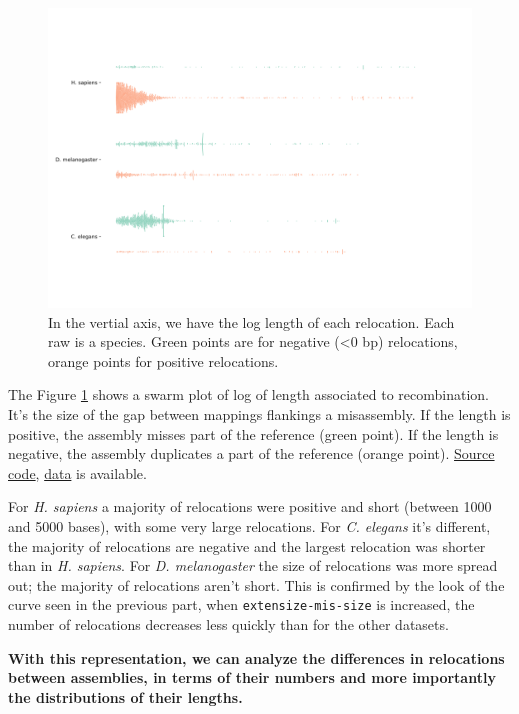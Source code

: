 \documentclass[./main.tex]{subfiles}
\begin{document}
\begin{figure}
    \centering
    \includegraphics[width=\textwidth]{paper/misassemblies-in-noisy-assemblies/relocation_length.pdf}   
    \caption{In the vertial axis, we have the log length of each relocation. Each raw is a species. Green points are for negative (\textless{}0 bp) relocations, orange points for positive relocations.}
    \label{swarmplot}
\end{figure}

The Figure \ref{swarmplot} shows a swarm plot of log of length associated to
recombination. It's the size of the gap between mappings flankings a
misassembly. If the length is positive, the assembly misses part of the
reference (green point). If the length is negative, the assembly
duplicates a part of the reference (orange point).
\href{relocation_length.py}{Source code},
\href{relocation_length.csv}{data} is available.

For \emph{H. sapiens} a majority of relocations were positive and short
(between 1000 and 5000 bases), with some very large relocations. For
\emph{C. elegans} it's different, the majority of relocations are
negative and the largest relocation was shorter than in \emph{H.
sapiens}. For \emph{D. melanogaster} the size of relocations was more
spread out; the majority of relocations aren't short. This is confirmed
by the look of the curve seen in the previous part, when
\texttt{extensize-mis-size} is increased, the number of relocations
decreases less quickly than for the other datasets.

\textbf{With this representation, we can analyze the differences in
relocations between assemblies, in terms of their numbers and more
importantly the distributions of their lengths.}
\end{document}
